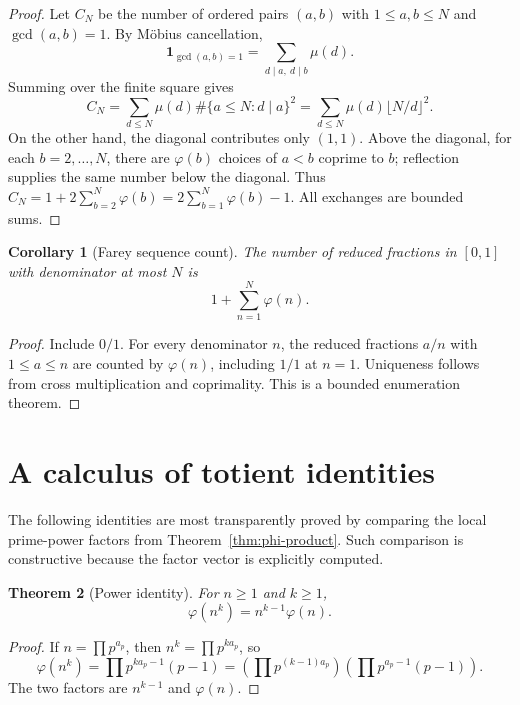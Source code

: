 \documentclass[11pt]{article}
\newtheorem{theorem}{Theorem}[section]
\newtheorem{corollary}[theorem]{Corollary}
\theoremstyle{definition}
\newcommand{\ind}[1]{\mathbf 1_{#1}}
\begin{document}
\begin{proof}
Let \(C_N\) be the number of ordered pairs \((a,b)\) with
\(1\le a,b\le N\) and \(\gcd(a,b)=1\).  By M\"obius cancellation,
\[
 \ind{\gcd(a,b)=1}=\sum_{d\mid a,\ d\mid b}\mu(d).
\]
Summing over the finite square gives
\[
 C_N=\sum_{d\le N}\mu(d)\#\{a\le N:d\mid a\}^2
 =\sum_{d\le N}\mu(d)\lfloor N/d\rfloor^2.
\]
On the other hand, the diagonal contributes only \((1,1)\).  Above the
diagonal, for each \(b=2,\ldots,N\), there are \(\varphi(b)\) choices of
\(a<b\) coprime to \(b\); reflection supplies the same number below the
diagonal.  Thus
\(C_N=1+2\sum_{b=2}^N\varphi(b)=2\sum_{b=1}^N\varphi(b)-1\).
All exchanges are bounded sums.
\end{proof}

\begin{corollary}[Farey sequence count]
The number of reduced fractions in \([0,1]\) with denominator at most \(N\)
is
\[
 1+\sum_{n=1}^{N}\varphi(n).
\]
\end{corollary}

\begin{proof}
Include \(0/1\).  For every denominator \(n\), the reduced fractions
\(a/n\) with \(1\le a\le n\) are counted by \(\varphi(n)\), including
\(1/1\) at \(n=1\).  Uniqueness follows from cross multiplication and
coprimality.  This is a bounded enumeration theorem.
\end{proof}

\section{A calculus of totient identities}

The following identities are most transparently proved by comparing the local
prime-power factors from Theorem~\ref{thm:phi-product}.  Such comparison is
constructive because the factor vector is explicitly computed.

\begin{theorem}[Power identity]\label{thm:phi-power}
For \(n\ge1\) and \(k\ge1\),
\[
 \boxed{\varphi(n^k)=n^{k-1}\varphi(n).}
\]
\end{theorem}

\begin{proof}
If \(n=\prod p^{a_p}\), then \(n^k=\prod p^{ka_p}\), so
\[
 \varphi(n^k)=\prod p^{ka_p-1}(p-1)
 =\left(\prod p^{(k-1)a_p}\right)
   \left(\prod p^{a_p-1}(p-1)\right).
\]
The two factors are \(n^{k-1}\) and \(\varphi(n)\).
\end{proof}
\end{document}

